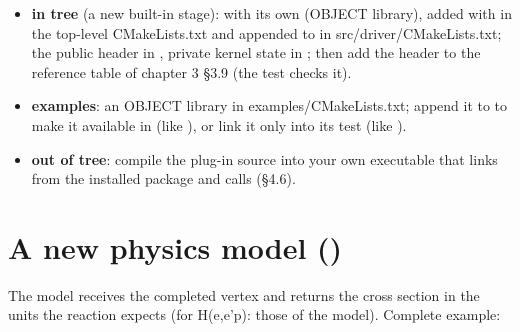 \begin{itemize}
\item \textbf{in tree} (a new built-in stage):  with its own  (OBJECT library), added with
 in the top-level CMakeLists.\allowbreak{}txt and appended to  in src/\allowbreak{}driver/\allowbreak{}CMakeLists.\allowbreak{}txt; the
public header in , private kernel state in ; then add the header
to the reference table of chapter 3 §3.9 (the  test checks it).
\item \textbf{examples}: an OBJECT library in examples/\allowbreak{}CMakeLists.\allowbreak{}txt; append it to  to make it available in
 (like ), or link it only into its test (like ).
\item \textbf{out of tree}: compile the plug-in source into your own executable that links  from the installed
package and calls  (§4.6).
\end{itemize}
\section{\texorpdfstring{A new physics model ()}{A new physics model (IPhysicsModel)}}\label{developer_manual-04u5fextending:42-a-new-physics-model-iphysicsmodel}
The model receives the completed vertex and returns the cross section in the units the reaction expects
(for H(e,e'p): those of the  model). Complete example:

